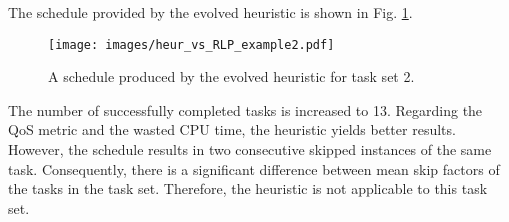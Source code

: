 The schedule provided by the evolved heuristic is shown in Fig. \ref{heur_example_2}.
\begin{figure}[ht]
    \centering
    \texttt{[image: images/heur\_vs\_RLP\_example2.pdf]}
    \caption{A schedule produced by the evolved heuristic for task set 2.}
    \label{heur_example_2}
\end{figure}
The number of successfully completed tasks is increased to 13.
Regarding the QoS metric and the wasted CPU time, the heuristic yields better results.
However, the schedule results in two consecutive skipped instances of the same task.
Consequently, there is a significant difference between mean skip factors of the tasks in the task set.
Therefore, the heuristic is not applicable to this task set.



